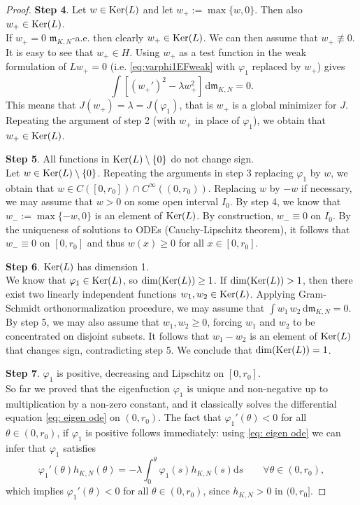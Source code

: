 \documentclass[12pt]{article}
\newcommand{\dd}{\mathrm{d}}
\newcommand{\mm}{\mathfrak m}
\theoremstyle{plain}
\theoremstyle{definition}
\begin{document}
\begin{proof}
  \textbf{Step 4}. Let $w\in {\rm Ker}(L)$ and let $w_+:=\max\{w,0\}$. Then also $w_+\in  {\rm Ker}(L)$.
 \\If $w_+=0$ $\mm_{K,N}$-a.e. then clearly $w_+\in   {\rm Ker}(L)$. We can then assume that $w_+\not \equiv 0$. It is easy to see that $w_+\in H$. Using $w_+$ as a test function in the weak formulation of $L w_+=0$ (i.e. \eqref{eq:varphi1EFweak} with $\varphi_1$ replaced by $w_+$) gives
$$
\int \left[(w_+')^2- \lambda  w_+^2 \right] \, \dd \mm_{K,N}=0.
$$
This means that $J(w_+)=\lambda=J(\varphi_1)$, that is $w_+$ is a global minimizer for $J$. Repeating the argument of step 2 (with $w_+$ in place of $\varphi_1$), we obtain that $w_+\in  {\rm Ker}(L)$.
\medskip

  \textbf{Step 5}.   All functions in ${\rm Ker}(L)\setminus\{0\}$ do not change sign.
  \\Let $w\in {\rm Ker}(L)\setminus\{0\}$. Repeating the arguments in step 3 replacing $\varphi_1$ by $w$, we obtain that $w\in C([0,r_0])\cap C^\infty((0,r_0))$. Replacing $w$ by $-w$ if necessary, we may assume that $w>0$ on some open interval $I_0$. By step 4, we know that $w_-:=\max\{-w,0\}$ is an element of ${\rm Ker}(L)$. By construction, $w_-\equiv 0$ on $I_0$. By the uniqueness of solutions to ODEs (Cauchy-Lipschitz theorem), it follows that $w_- \equiv 0$ on $[0, r_0]$ and thus $w(x)\geq 0$ for all $x\in [0,r_0]$.  
\medskip

  \textbf{Step 6}.  ${\rm Ker}(L)$ has dimension 1.
\\We know that $\varphi_1\in {\rm Ker}(L)$, so ${\rm dim} ({\rm Ker}(L))\geq 1$. If ${\rm dim} ({\rm Ker}(L))> 1$, then there exist two linearly independent functions $w_1, w_2\in {\rm Ker}(L)$. Applying Gram-Schmidt orthonormalization procedure, we may assume that $\int w_1 \, w_2\, \dd \mm_{K,N}=0$.  By step 5, we may also assume that $w_1, w_2\geq 0$, forcing $w_1$ and $w_2$ to be concentrated on disjoint subsets. It follows that $w_1-w_2$ is an element of ${\rm Ker}(L)$ that changes sign, contradicting step 5.  We conclude that ${\rm dim} ({\rm Ker}(L))= 1$.
\medskip

 \textbf{Step 7}. $\varphi_1$ is positive, decreasing and Lipschitz on $[0,r_0]$.
\\So far we proved that the eigenfuction $\varphi_1$ is unique and non-negative up to multiplication by a non-zero constant, and it classically solves the differential equation \eqref{eq: eigen ode} on $(0,r_0)$. The fact that $\varphi_1'(\theta)< 0$ for all $\theta\in (0,r_0)$, if $\varphi_1$ is positive follows immediately: using \eqref{eq: eigen ode} we can infer that $\varphi_1$ satisfies
\begin{equation}\label{eq: identity phi'-phi}
\varphi_1'(\theta)h_{K,N}(\theta)=-\lambda\int_0^{\theta} \varphi_1(s)h_{K,N}(s)\dd s \qquad  \forall \theta\in (0,r_0),
\end{equation}
which implies $\varphi_1'(\theta)< 0$ for all $\theta\in (0,r_0)$, since $h_{K,N}>0$ in $(0,r_0]$. 


\end{proof}
\end{document}
